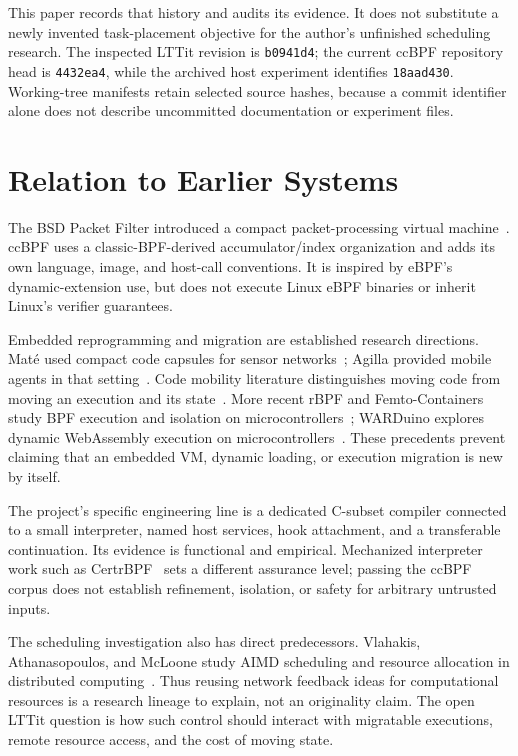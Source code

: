 \documentclass[conference,letterpaper]{IEEEtran}
\begin{document}
This paper records that history and audits its evidence. It does not substitute a newly invented task-placement objective for the author's unfinished scheduling research. The inspected LTTit revision is \texttt{b0941d4}; the current ccBPF repository head is \texttt{4432ea4}, while the archived host experiment identifies \texttt{18aad430}. Working-tree manifests retain selected source hashes, because a commit identifier alone does not describe uncommitted documentation or experiment files.

\section{Relation to Earlier Systems}
The BSD Packet Filter introduced a compact packet-processing virtual machine~\cite{bpf}. ccBPF uses a classic-BPF-derived accumulator/index organization and adds its own language, image, and host-call conventions. It is inspired by eBPF's dynamic-extension use, but does not execute Linux eBPF binaries or inherit Linux's verifier guarantees.

Embedded reprogramming and migration are established research directions. Mat\'e used compact code capsules for sensor networks~\cite{mate}; Agilla provided mobile agents in that setting~\cite{agilla}. Code mobility literature distinguishes moving code from moving an execution and its state~\cite{mobility}. More recent rBPF and Femto-Containers study BPF execution and isolation on microcontrollers~\cite{rbpf,femto}; WARDuino explores dynamic WebAssembly execution on microcontrollers~\cite{warduino}. These precedents prevent claiming that an embedded VM, dynamic loading, or execution migration is new by itself.

The project's specific engineering line is a dedicated C-subset compiler connected to a small interpreter, named host services, hook attachment, and a transferable continuation. Its evidence is functional and empirical. Mechanized interpreter work such as CertrBPF~\cite{cert} sets a different assurance level; passing the ccBPF corpus does not establish refinement, isolation, or safety for arbitrary untrusted inputs.

The scheduling investigation also has direct predecessors. Vlahakis, Athanasopoulos, and McLoone study AIMD scheduling and resource allocation in distributed computing~\cite{aimd}. Thus reusing network feedback ideas for computational resources is a research lineage to explain, not an originality claim. The open LTTit question is how such control should interact with migratable executions, remote resource access, and the cost of moving state.
\end{document}
